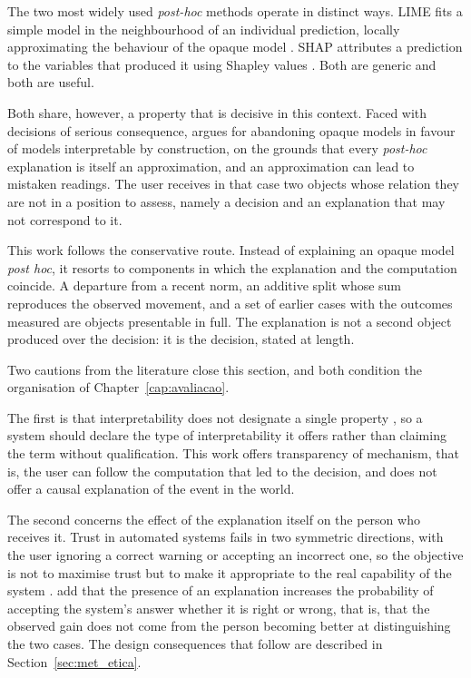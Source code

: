 The two most widely used \emph{post-hoc} methods operate in distinct ways. \gls{LIME} fits a simple
model in the neighbourhood of an individual prediction, locally approximating the behaviour of the
opaque model \autocite{ribeiro2016lime}. \gls{SHAP} attributes a prediction to the variables that
produced it using Shapley values \autocite{lundberg2017shap}. Both are generic and both are useful.

Both share, however, a property that is decisive in this context. Faced with decisions of serious
consequence, \textcite{rudin2019stop} argues for abandoning opaque models in favour of models
interpretable by construction, on the grounds that every \emph{post-hoc} explanation is itself an
approximation, and an approximation can lead to mistaken readings. The user receives in that case
two objects whose relation they are not in a position to assess, namely a decision and an
explanation that may not correspond to it.

This work follows the conservative route. Instead of explaining an opaque model \emph{post hoc}, it
resorts to components in which the explanation and the computation coincide. A departure from a
recent norm, an additive split whose sum reproduces the observed movement, and a set of earlier
cases with the outcomes measured are objects presentable in full. The explanation is not a second
object produced over the decision: it is the decision, stated at length.

Two cautions from the literature close this section, and both condition the organisation of
Chapter~\ref{cap:avaliacao}.

The first is that interpretability does not designate a single property
\autocite{lipton2018mythos}, so a system should declare the type of interpretability it offers
rather than claiming the term without qualification. This work offers transparency of mechanism,
that is, the user can follow the computation that led to the decision, and does not offer a causal
explanation of the event in the world.

The second concerns the effect of the explanation itself on the person who receives it. Trust in
automated systems fails in two symmetric directions, with the user ignoring a correct warning or
accepting an incorrect one, so the objective is not to maximise trust but to make it appropriate to
the real capability of the system \autocite{lee2004trust}. \textcite{bansal2021whole} add that the
presence of an explanation increases the probability of accepting the system's answer whether it is
right or wrong, that is, that the observed gain does not come from the person becoming better at
distinguishing the two cases. The design consequences that follow are described in
Section~\ref{sec:met_etica}.

